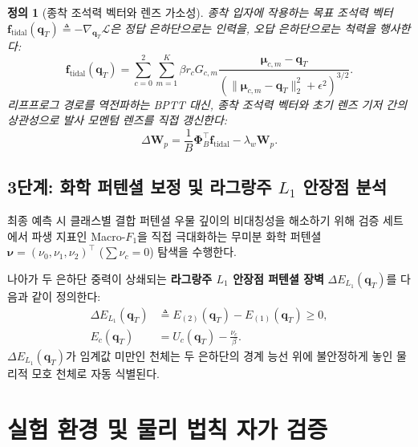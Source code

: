 \documentclass[journal]{IEEEtran}
\newtheorem{definition}{정의}
\begin{document}
\begin{definition}[종착 조석력 벡터와 렌즈 가소성]
종착 입자에 작용하는 목표 조석력 벡터 $\mathbf{f}_{\text{tidal}}(\mathbf{q}_T) \triangleq -\nabla_{\mathbf{q}_T} \mathcal{L}$은 정답 은하단으로는 인력을, 오답 은하단으로는 척력을 행사한다:
\begin{equation}
  \mathbf{f}_{\text{tidal}}(\mathbf{q}_T) = \sum_{c=0}^2 \sum_{m=1}^K \beta r_c G_{c,m} \frac{\boldsymbol{\mu}_{c,m} - \mathbf{q}_T}{\left(\|\boldsymbol{\mu}_{c,m} - \mathbf{q}_T\|_2^2 + \epsilon^2\right)^{3/2}}.
  \label{eq:tidal_force}
\end{equation}
리프프로그 경로를 역전파하는 BPTT 대신, 종착 조석력 벡터와 초기 렌즈 기저 간의 상관성으로 발사 모멘텀 렌즈를 직접 갱신한다:
\begin{equation}
  \Delta \mathbf{W}_p = \frac{1}{B}\boldsymbol{\Phi}_B^\top \mathbf{f}_{\text{tidal}} - \lambda_w \mathbf{W}_p.
  \label{eq:hebbian_wp}
\end{equation}
\end{definition}

\subsection{3단계: 화학 퍼텐셜 보정 및 라그랑주 \texorpdfstring{$L_1$}{L1} 안장점 분석}
최종 예측 시 클래스별 결합 퍼텐셜 우물 깊이의 비대칭성을 해소하기 위해 검증 세트에서 파생 지표인 Macro-$F_1$을 직접 극대화하는 무미분 화학 퍼텐셜 $\boldsymbol{\nu} = (\nu_0, \nu_1, \nu_2)^\top$ ($\sum \nu_c = 0$) 탐색을 수행한다.

나아가 두 은하단 중력이 상쇄되는 \textbf{라그랑주 $L_1$ 안장점 퍼텐셜 장벽} $\Delta E_{L_1}(\mathbf{q}_T)$를 다음과 같이 정의한다:
\begin{align}
  \Delta E_{L_1}(\mathbf{q}_T) &\triangleq E_{(2)}(\mathbf{q}_T) - E_{(1)}(\mathbf{q}_T) \ge 0, \nonumber \\
  E_c(\mathbf{q}_T) &= U_c(\mathbf{q}_T) - \frac{\nu_c}{\beta}.
  \label{eq:lagrange_barrier}
\end{align}
$\Delta E_{L_1}(\mathbf{q}_T)$가 임계값 미만인 천체는 두 은하단의 경계 능선 위에 불안정하게 놓인 물리적 모호 천체로 자동 식별된다.

\section{실험 환경 및 물리 법칙 자가 검증}
\end{document}
